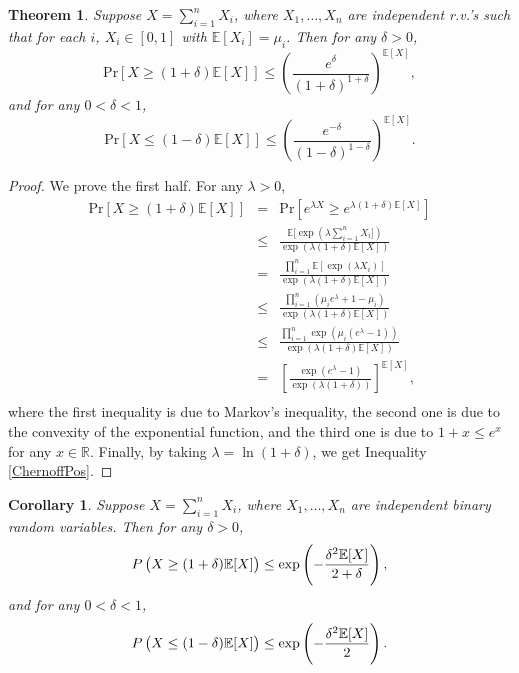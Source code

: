 \documentclass[openany]{book}
\newtheorem{corollary}{Corollary}[chapter]
\newtheorem{theorem}{Theorem}[chapter]
\theoremstyle{definition}
\theoremstyle{remark}
\begin{document}
\begin{theorem}\label{thm:ChernoffMult}
    Suppose $X=\sum_{i=1}^{n}X_i$, where $X_1,\ldots,X_n$ are independent r.v.'s such that for each $i$, $X_i\in[0,1]$ with $\mathbb{E}[X_i]=\mu_i$. Then for any $\delta>0$,
    \begin{equation}\label{ChernoffPos}
        \mathrm{Pr}\left[X\ge(1+\delta)\mathbb{E}[X]\right]\le\left(\frac{e^{\delta}}{(1+\delta)^{1+\delta}}\right)^{\mathbb{E}[X]},
    \end{equation}
    and for any $0<\delta<1$,
    \begin{equation}\label{ChernoffNeg}
        \mathrm{Pr}\left[X\le(1-\delta)\mathbb{E}[X]\right]\le\left(\frac{e^{-\delta}}{(1-\delta)^{1-\delta}}\right)^{\mathbb{E}[X]}.
    \end{equation}
\end{theorem}
\begin{proof}
    We prove the first half. For any $\lambda>0$,
    \begin{equation*}
        \begin{array}{rcl}
            \mathrm{Pr}[X\ge(1+\delta)\mathbb{E}[X]] & = & \mathrm{Pr}[e^{\lambda X}\ge e^{\lambda(1+\delta)\mathbb{E}[X]}] \\
             & \le & \displaystyle \frac{\mathbb{E}[\exp(\lambda \sum_{i=1}^{n}X_i])}{\exp(\lambda(1+\delta)\mathbb{E}[X])} \\
             & = & \displaystyle \frac{\prod_{i=1}^{n}\mathbb{E}[\exp(\lambda X_i)]}{\exp(\lambda(1+\delta)\mathbb{E}[X])} \\
             & \le & \displaystyle \frac{\prod_{i=1}^{n}(\mu_ie^{\lambda}+1-\mu_i)}{\exp(\lambda(1+\delta)\mathbb{E}[X])} \\
             & \le & \displaystyle \frac{\prod_{i=1}^{n}\exp(\mu_i(e^{\lambda}-1))}{\exp(\lambda(1+\delta)\mathbb{E}[X])} \\
             & = & \displaystyle\left[\frac{\exp(e^{\lambda}-1)}{\exp(\lambda(1+\delta))}\right]^{\mathbb{E}[X]}, \\
        \end{array}
    \end{equation*}
    where the first inequality is due to Markov's inequality, the second one is due to the convexity of the exponential function, and the third one is due to $1+x\le e^x$ for any $x\in \mathbb{R}$. Finally, by taking $\lambda=\ln(1+\delta)$, we get Inequality \eqref{ChernoffPos}.
\end{proof}
\begin{corollary}\label{cor:Chernoff}
    Suppose $X=\sum_{i=1}^{n}X_i$, where $X_1,\ldots,X_n$ are independent binary random variables. Then for any $\delta>0$,
    \begin{equation}\label{ChernoffPosSpecial}
        P\del{X\ge(1+\delta)\mathbb{E}[X]}\le\exp\left(-\frac{\delta^2 \mathbb{E}[X]}{2+\delta}\right),
    \end{equation}
    and for any $0<\delta<1$,
    \begin{equation}\label{ChernoffNegSpecial}
        P\del{X\le(1-\delta)\mathbb{E}[X]}\le\exp\left(-\frac{\delta^2 \mathbb{E}[X]}{2}\right).
    \end{equation}
\end{corollary}
\end{document}
